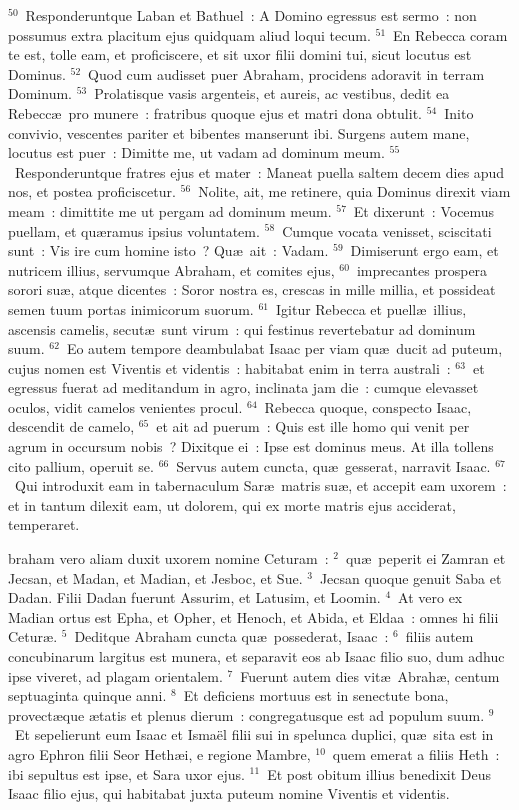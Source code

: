${}^{50}$~Responderuntque Laban et Bathuel~: A Domino egressus est sermo~: non possumus extra placitum ejus quidquam aliud loqui tecum.
${}^{51}$~En Rebecca coram te est, tolle eam, et proficiscere, et sit uxor filii domini tui, sicut locutus est Dominus.
${}^{52}$~Quod cum audisset puer Abraham, procidens adoravit in terram Dominum.
${}^{53}$~Prolatisque vasis argenteis, et aureis, ac vestibus, dedit ea Rebecc\ae\ pro munere~: fratribus quoque ejus et matri dona obtulit.
${}^{54}$~Inito convivio, vescentes pariter et bibentes manserunt ibi. Surgens autem mane, locutus est puer~: Dimitte me, ut vadam ad dominum meum.
${}^{55}$~Responderuntque fratres ejus et mater~: Maneat puella saltem decem dies apud nos, et postea proficiscetur.
${}^{56}$~Nolite, ait, me retinere, quia Dominus direxit viam meam~: dimittite me ut pergam ad dominum meum.
${}^{57}$~Et dixerunt~: Vocemus puellam, et qu\ae ramus ipsius voluntatem.
${}^{58}$~Cumque vocata venisset, sciscitati sunt~: Vis ire cum homine isto~? Qu\ae\ ait~: Vadam.
${}^{59}$~Dimiserunt ergo eam, et nutricem illius, servumque Abraham, et comites ejus,
${}^{60}$~imprecantes prospera sorori su\ae , atque dicentes~: Soror nostra es, crescas in mille millia, et possideat semen tuum portas inimicorum suorum.
${}^{61}$~Igitur Rebecca et puell\ae\ illius, ascensis camelis, secut\ae\ sunt virum~: qui festinus revertebatur ad dominum suum.
${}^{62}$~Eo autem tempore deambulabat Isaac per viam qu\ae\ ducit ad puteum, cujus nomen est Viventis et videntis~: habitabat enim in terra australi~:
${}^{63}$~et egressus fuerat ad meditandum in agro, inclinata jam die~: cumque elevasset oculos, vidit camelos venientes procul.
${}^{64}$~Rebecca quoque, conspecto Isaac, descendit de camelo,
${}^{65}$~et ait ad puerum~: Quis est ille homo qui venit per agrum in occursum nobis~? Dixitque ei~: Ipse est dominus meus. At illa tollens cito pallium, operuit se.
${}^{66}$~Servus autem cuncta, qu\ae\ gesserat, narravit Isaac.
${}^{67}$~Qui introduxit eam in tabernaculum Sar\ae\ matris su\ae , et accepit eam uxorem~: et in tantum dilexit eam, ut dolorem, qui ex morte matris ejus acciderat, temperaret.

\bchapter
{}braham vero aliam duxit uxorem nomine Ceturam~:
${}^{2}$~qu\ae\ peperit ei Zamran et Jecsan, et Madan, et Madian, et Jesboc, et Sue.
${}^{3}$~Jecsan quoque genuit Saba et Dadan. Filii Dadan fuerunt Assurim, et Latusim, et Loomin.
${}^{4}$~At vero ex Madian ortus est Epha, et Opher, et Henoch, et Abida, et Eldaa~: omnes hi filii Cetur\ae .
${}^{5}$~Deditque Abraham cuncta qu\ae\ possederat, Isaac~:
${}^{6}$~filiis autem concubinarum largitus est munera, et separavit eos ab Isaac filio suo, dum adhuc ipse viveret, ad plagam orientalem.
${}^{7}$~Fuerunt autem dies vit\ae\ Abrah\ae , centum septuaginta quinque anni.
${}^{8}$~Et deficiens mortuus est in senectute bona, provect\ae que \ae tatis et plenus dierum~: congregatusque est ad populum suum.
${}^{9}$~Et sepelierunt eum Isaac et Isma\"el filii sui in spelunca duplici, qu\ae\ sita est in agro Ephron filii Seor Heth\ae i, e regione Mambre,
${}^{10}$~quem emerat a filiis Heth~: ibi sepultus est ipse, et Sara uxor ejus.
${}^{11}$~Et post obitum illius benedixit Deus Isaac filio ejus, qui habitabat juxta puteum nomine Viventis et videntis.


